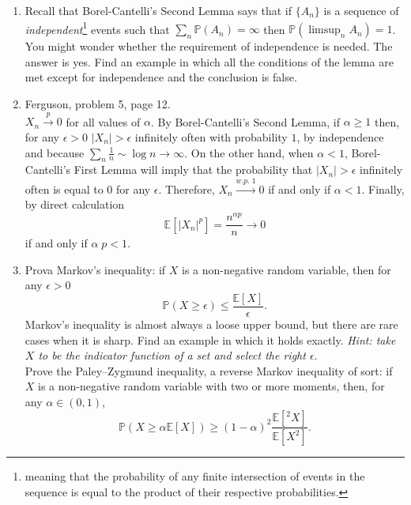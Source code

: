 \documentclass[12pt]{article}
\begin{document}
\begin{enumerate}
\item Recall that Borel-Cantelli's Second Lemma says that if $\{ A_n \}$ is a sequence of {\it independent}\footnote{meaning that the probability of any finite intersection of events in the sequence is equal to the product of their respective probabilities.} events such that $\sum_n \mathbb{P}(A_n) = \infty$ then $\mathbb{P}(\limsup_n A_n)=1$. You might wonder whether the requirement of independence is needed. The answer is yes. Find an example in which all the conditions of the lemma are met except for independence and the conclusion is false.

\item Ferguson, problem 5, page 12.\\
\color{blue}
$X_n \stackrel{p}{\to} 0$ for all values of $\alpha$. By Borel-Cantelli's Second Lemma, if $\alpha \geq 1$ then, for any $\epsilon > 0$ $|X_n| > \epsilon$ infinitely often with probability $1$, by independence and because $\sum_n \frac{1}{n} \sim \log n \to \infty$. On the other hand, when $\alpha < 1$, Borel-Cantelli's First Lemma will imply that the probability that $|X_n| > \epsilon$ infinitely often is equal to $0$ for any $\epsilon$. Therefore, $X_n \stackrel{w.p. \; 1}{\to} 0$ if and only if $\alpha < 1$.  Finally, by direct calculation
\[
\mathbb{E}[|X_n|^p] = \frac{n^{\alpha p}}{n}  \to 0
\]
if and only if $\alpha \; p < 1$.
\color{black}

\item Prova Markov's inequality: if $X$ is a non-negative random variable, then for any $\epsilon > 0$
\[
\mathbb{P} ( X \geq \epsilon) \leq \frac{\mathbb{E}[X]}{\epsilon}.
\]
Markov's inequality is almost always a loose upper bound, but there are rare cases when it is sharp. Find an example in which it holds exactly. {\it Hint: take $X$ to be the indicator function of a set and select the right $\epsilon$}.\\
Prove the Paley–Zygmund inequality, a reverse Markov inequality of sort: if $X$ is a non-negative random variable with two or more moments, then, for any $\alpha \in (0,1)$,
\[
\mathbb{P} ( X \geq \alpha \mathbb{E}[X]) \geq (1 - \alpha)^2 \frac{\mathbb{E}[^2X]}{\mathbb{E}[X^2]}.
\] 


\end{enumerate}
\end{document}
